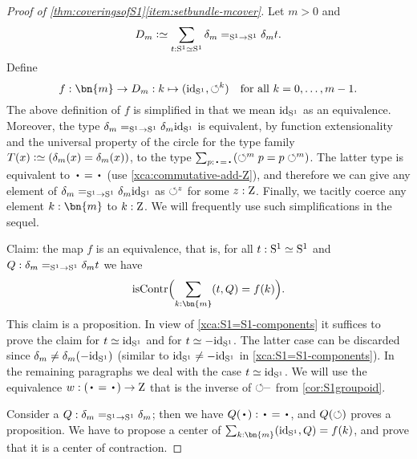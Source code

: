 \begin{proof}[Proof of \cref{thm:coveringsofS1}\ref{item:setbundle-mcover}]
  Let $m>0$ and
  \[
    D_m\defequi\sum_{t:\Sc\equiv\Sc} \dg{m} =_{\Sc\to\Sc} \dg{m} t.
  \]
Define
\[
f: \bn{m} \to D_m: k \mapsto (\id_\Sc,{\Sloop}^k)\quad\text{for all $k=0,\ldots,m-1$}.
\]
The above definition of $f$ is simplified in that we mean $\mathord{\mathrm{id}}_{\mathrm{S}^1}$
as an equivalence. Moreover, the type $\delta_{m} =_{{\mathrm{S}^1}\to{\mathrm{S}^1}} \delta_{m} \mathord{\mathrm{id}}_{\mathrm{S}^1}$ is equivalent,
by function extensionality and the universal property of the circle for
the type family $T(x)\defeq (\dg{m}(x) = \dg{m}(x))$, to the type
$\sum_{p: \base=\base} (\Sloop^m p = p \Sloop^m)$.
The latter type is equivalent to $\base=\base$ (use \cref{xca:commutative-add-Z}), and therefore
we can give any element of $\delta_{m} =_{{\mathrm{S}^1}\to{\mathrm{S}^1}} \delta_{m} \mathord{\mathrm{id}}_{\mathrm{S}^1}$ as $\circlearrowleft^z$ for some $z:\mathrm{Z}$.
Finally, we tacitly coerce any element $k:\bn{m}$ to $k:\mathrm{Z}$.
We will frequently use such simplifications in the sequel.

Claim: the map $f$ is an equivalence, that is,
for all $t:{\mathrm{S}^1}\simeq{\mathrm{S}^1}$ and $Q : \delta_{m} =_{{\mathrm{S}^1}\to{\mathrm{S}^1}} \delta_{m} t$ we have
\[
\iscontr\Bigl(\sum_{k:\bn{m}} (t,Q) = f(k)\Bigr).
\]
This claim is a proposition.
In view of \cref{xca:S1=S1-components} it suffices to prove the claim
for $t\jdeq\id_\Sc$ and for $t\jdeq -\id_\Sc$. The latter case can be discarded
since $\delta_{m} \neq \delta_{m} (-\mathord{\mathrm{id}}_{\mathrm{S}^1})$
(similar to $\mathord{\mathrm{id}}_{\mathrm{S}^1} \neq -\mathord{\mathrm{id}}_{\mathrm{S}^1}$ in \cref{xca:S1=S1-components}).
In the remaining paragraphs we deal with the case $t\jdeq\id_\Sc$.
We will use the equivalence $w: (\base=\base)\to\zet$ that
is the inverse of ${\circlearrowleft}^{\_}$ from \cref{cor:S1groupoid}.

Consider a $Q: \delta_{m} =_{{\mathrm{S}^1}\to{\mathrm{S}^1}} \delta_{m}$; then we have $Q(\base): \base=\base$,
and $Q(\circlearrowleft)$ proves a proposition.
We have to propose a center of $\sum_{k:\bn{m}} (\id_\Sc,Q) = f(k)$,
and prove that it is a center of contraction.


\end{proof}
